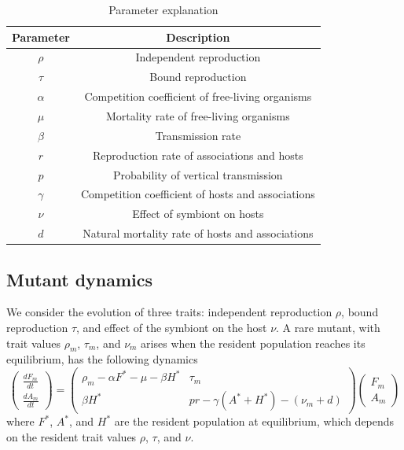 \documentclass[11pt]{article}
\begin{document}
\begin{table}[ht!]
	\centering
	\begin{tabular}{c| c}
		\hline
		Parameter & Description \\
		\hline
		$\rho$ & Independent reproduction \\
		\hline 
		$\tau$ & Bound reproduction \\
		\hline
		$\alpha$ & Competition coefficient of free-living organisms \\
		\hline
		$\mu$ & Mortality rate of free-living organisms \\
		\hline
		$\beta$  & Transmission rate \\
		\hline
		$r$ & Reproduction rate of associations and hosts \\
		\hline
		$p$ & Probability of vertical transmission \\
		\hline
		$\gamma$ & Competition coefficient of hosts and associations \\
		\hline
		$\nu$ & Effect of symbiont on hosts \\
		\hline
		$d$ & Natural mortality rate of hosts and associations \\
		\hline
	\end{tabular}
	\caption{Parameter explanation}
	\label{table:parameters}
\end{table}

\subsection*{Mutant dynamics}
We consider the evolution of three traits: independent reproduction $\rho$, bound reproduction $\tau$, and effect of the symbiont on the host $\nu$. A rare mutant, with trait values $\rho_m$, $\tau_m$, and $\nu_m$ arises when the resident population reaches its equilibrium, has the following dynamics
\begin{equation}
	\begin{pmatrix}
		\frac{d F_m}{dt} \\
		\frac{d A_m}{dt}
	\end{pmatrix}
	=
	\begin{pmatrix}
		\rho_m - \alpha F^* - \mu - \beta H^* & \tau_m \\
		\beta H^* & p r - \gamma(A^* + H^*) - (\nu_m + d)
	\end{pmatrix}
	  \begin{pmatrix}
	  	F_m \\ A_m
	  \end{pmatrix}
	  \label{eq:mutant_dyn}
\end{equation}
where $F^*$, $A^*$, and $H^*$ are the resident population at equilibrium, which depends on the resident trait values $\rho$, $\tau$, and $\nu$. 
\end{document}
